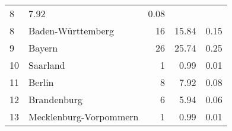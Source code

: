 \begin{longtable}{lXrrr}
       \num{8} &
       \num[round-mode=places,round-precision=2]{7,92} &
         \num[round-mode=places,round-precision=2]{0,08} \\

     8 &
     \multicolumn{1}{X}{ Baden-Württemberg   } &


       \num{16} &
       \num[round-mode=places,round-precision=2]{15,84} &
         \num[round-mode=places,round-precision=2]{0,15} \\

     9 &
     \multicolumn{1}{X}{ Bayern   } &


       \num{26} &
       \num[round-mode=places,round-precision=2]{25,74} &
         \num[round-mode=places,round-precision=2]{0,25} \\

     10 &
     \multicolumn{1}{X}{ Saarland   } &


       \num{1} &
       \num[round-mode=places,round-precision=2]{0,99} &
         \num[round-mode=places,round-precision=2]{0,01} \\

     11 &
     \multicolumn{1}{X}{ Berlin   } &


       \num{8} &
       \num[round-mode=places,round-precision=2]{7,92} &
         \num[round-mode=places,round-precision=2]{0,08} \\

     12 &
     \multicolumn{1}{X}{ Brandenburg   } &


       \num{6} &
       \num[round-mode=places,round-precision=2]{5,94} &
         \num[round-mode=places,round-precision=2]{0,06} \\

     13 &
     \multicolumn{1}{X}{ Mecklenburg-Vorpommern   } &


       \num{1} &
       \num[round-mode=places,round-precision=2]{0,99} &
         \num[round-mode=places,round-precision=2]{0,01} \\


\end{longtable}
